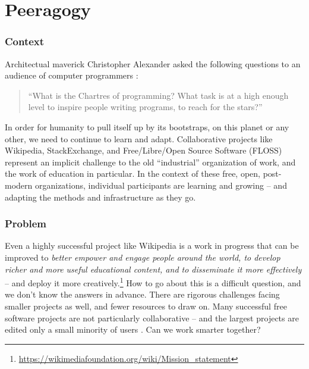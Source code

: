 \section{Peeragogy}\label{sec:Peeragogy}

\subsubsection*{Context}  Architectual maverick Christopher Alexander asked the following questions to an audience of computer programmers \cite{alexander1999origins}: 
\begin{quote}
``What is the Chartres of programming? What task is at a high enough level to inspire people writing programs, to reach for the stars?''
\end{quote}
In order for humanity to pull itself up by its bootstraps, on this planet or any other, we need to continue to learn and adapt.  Collaborative projects like Wikipedia, StackExchange, and Free/Libre/Open Source Software (FLOSS) represent an implicit challenge to the old ``industrial'' organization of work, and the work of education in particular.  In the context of these free, open, post-modern organizations, individual participants are learning and growing -- and adapting the methods and infrastructure as they go.

\subsubsection*{Problem} Even a highly successful project like Wikipedia is a work in progress that can be improved to \emph{\emph{better} empower and engage people around the world, to develop \emph{richer and more useful} educational content, and to disseminate it \emph{more} effectively} -- and deploy it more creatively.\footnote{\url{https://wikimediafoundation.org/wiki/Mission_statement}}  How to go about this is a difficult question, and we don't know the answers in advance.  There are rigorous challenges facing smaller projects as well, and fewer resources to draw on.  Many successful free software projects are not particularly collaborative -- and the largest projects are edited only a small minority of users \cite{free-software-better,who-writes-wikipedia}.  Can we work smarter together?

